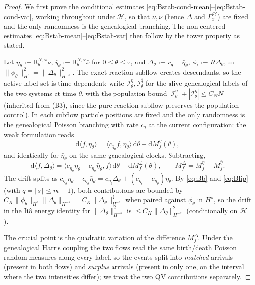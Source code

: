 \documentclass[a4paper,fleqn]{cas-sc}
\theoremstyle{definition}
\theoremstyle{remark}
\begin{document}
\begin{proof}
We first prove the conditional estimates
\eqref{eq:Bstab-cond-mean}--\eqref{eq:Bstab-cond-var}, working throughout under
$\mathcal H$, so that $\nu,\bar\nu$ (hence $\Delta$ and $\Gamma_x^{\mathcal H}$)
are fixed and the only randomness is the genealogical branching. The non-centered
estimates \eqref{eq:Bstab-mean}--\eqref{eq:Bstab-var} then follow by the tower
property as stated.

Let $\eta_\theta:=\mathsf B^{N,\omega}_\theta\nu$,
$\bar\eta_\theta:=\mathsf B^{N,\omega}_\theta\bar\nu$ for $0\le\theta\le\tau$, and
$\Delta_\theta:=\eta_\theta-\bar\eta_\theta$, $\phi_\theta:=R\Delta_\theta$, so
$\|\phi_\theta\|_{H^s}^2=\|\Delta_\theta\|_{H^{-s}}^2$. The exact reaction subflow
creates descendants, so the active label set is time-dependent: write
$\mathcal I^\eta_\theta,\mathcal I^{\bar\eta}_\theta$ for the alive genealogical
labels of the two systems at time $\theta$, with the population bound
$|\mathcal I^\eta_\theta|+|\mathcal I^{\bar\eta}_\theta|\le C_NN$ (inherited from
(B3), since the pure reaction subflow preserves the population control). In each
subflow particle positions are fixed and the only randomness is the genealogical
Poisson branching with rate $c_\eta$ at the current configuration; the weak
formulation reads
\[
\mathrm d\langle f,\eta_\theta\rangle
=\langle c_{\eta_\theta}f,\eta_\theta\rangle\,\mathrm d\theta
+\mathrm dM^\eta_f(\theta),
\]
and identically for $\bar\eta_\theta$ on the same genealogical clocks. Subtracting,
\[
\mathrm d\langle f,\Delta_\theta\rangle
=\langle c_{\eta_\theta}\eta_\theta-c_{\bar\eta_\theta}\bar\eta_\theta,f\rangle\,\mathrm d\theta
+\mathrm dM^\Delta_f(\theta),
\qquad M^\Delta_f=M^\eta_f-M^{\bar\eta}_f.
\]
The drift splits as
$c_{\eta_\theta}\eta_\theta-c_{\bar\eta_\theta}\bar\eta_\theta
=c_{\bar\eta_\theta}\Delta_\theta+(c_{\eta_\theta}-c_{\bar\eta_\theta})\eta_\theta$.
By \eqref{eq:Bb} and \eqref{eq:Blip} (with $q=\lceil s\rceil\le m-1$), both
contributions are bounded by $C_K\|\phi_\theta\|_{H^s}\|\Delta_\theta\|_{H^{-s}}
=C_K\|\Delta_\theta\|_{H^{-s}}^2$ when paired against $\phi_\theta$ in $H^s$, so
the drift in the It\^o energy identity for $\|\Delta_\theta\|_{H^{-s}}^2$ is
$\le C_K\|\Delta_\theta\|_{H^{-s}}^2$ (conditionally on $\mathcal H$).

The crucial point is the quadratic variation of the difference $M^\Delta_f$.
Under the genealogical Harris coupling the two flows read the same birth/death
Poisson random measures along every label, so the events split into
\emph{matched} arrivals (present in both flows) and \emph{surplus} arrivals
(present in only one, on the interval where the two intensities differ); we treat
the two QV contributions separately.


\end{proof}
\end{document}
